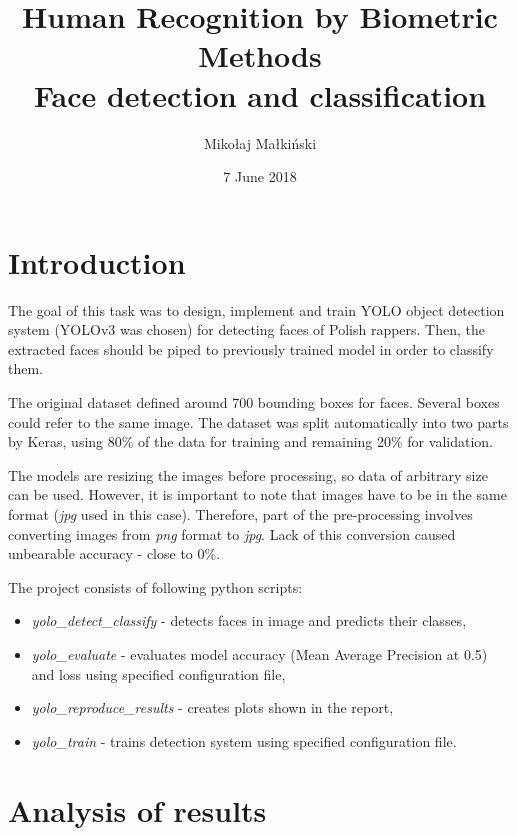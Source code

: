 \documentclass{article}
\title{
\textbf{Human Recognition by Biometric Methods}\\
\bigskip
\textbf{Face detection and classification}\\
\bigskip
}
\author{Mikołaj Małkiński}
\date{7 June 2018}
\begin{document}
    \maketitle

    \section{Introduction}\label{sec:introduction}

    The goal of this task was to design, implement and train YOLO object detection system (YOLOv3 was chosen) for detecting faces of Polish rappers.
    Then, the extracted faces should be piped to previously trained model in order to classify them.

    The original dataset defined around 700 bounding boxes for faces.
    Several boxes could refer to the same image.
    The dataset was split automatically into two parts by Keras, using 80\% of the data for training and remaining 20\% for validation.

    The models are resizing the images before processing, so data of arbitrary size can be used.
    However, it is important to note that images have to be in the same format (\textit{jpg} used in this case).
    Therefore, part of the pre-processing involves converting images from \textit{png} format to \textit{jpg}.
    Lack of this conversion caused unbearable accuracy - close to 0\%.

    The project consists of following python scripts:
    \begin{itemize}
        \item \textit{yolo\_detect\_classify} - detects faces in image and predicts their classes,
        \item \textit{yolo\_evaluate} - evaluates model accuracy (Mean Average Precision at 0.5) and loss using specified configuration file,
        \item \textit{yolo\_reproduce\_results} - creates plots shown in the report,
        \item \textit{yolo\_train} - trains detection system using specified configuration file.
    \end{itemize}

    \section{Analysis of results}\label{sec:analysisOfResults}
\end{document}

